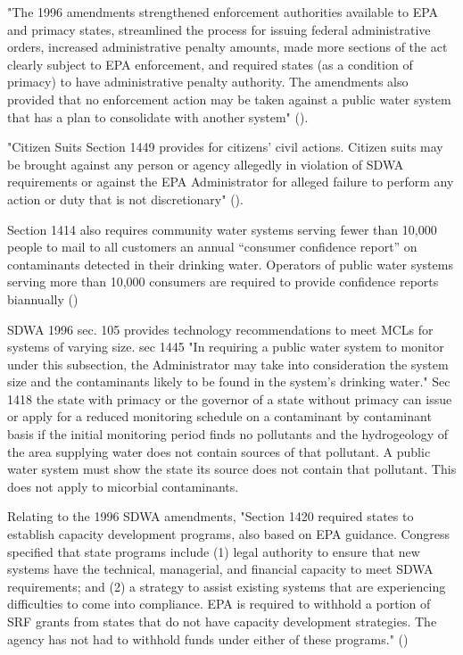 "The 1996 amendments strengthened enforcement authorities available to EPA and primacy states, streamlined the process for issuing federal administrative orders, increased administrative penalty amounts, made more sections of the act clearly subject to EPA enforcement, and required states (as a condition of primacy) to have administrative penalty authority. The amendments also provided that no enforcement action may be taken against a public water system that has a plan to consolidate with another system" (\cite{tiemann2014safe}).

"Citizen Suits Section 1449 provides for citizens’ civil actions. Citizen suits may be brought against any person or agency allegedly in violation of SDWA requirements or against the EPA Administrator for alleged failure to perform any action or duty that is not discretionary" (\cite{tiemann2014safe}).

Section 1414 also requires community water systems serving fewer than 10,000 people to mail to 
all customers an annual “consumer confidence report” on contaminants detected in their drinking 
water. Operators of public water systems serving more than 10,000 consumers are required to 
provide confidence reports biannually (\cite{tiemann2014safe})

SDWA 1996 sec. 105 provides technology recommendations to meet MCLs for systems of varying size. sec 1445 "In requiring a public water system to monitor under this subsection, the Administrator may take into consideration the system size and the contaminants likely to be found in the system's drinking water." Sec 1418 the state with primacy or the governor of a state without primacy can issue or apply for a reduced monitoring schedule on a contaminant by contaminant basis if the initial monitoring period finds no pollutants and the hydrogeology of the area supplying water does not contain sources of that pollutant. A public water system must show the state its source does not contain that pollutant. This does not apply to micorbial contaminants.

Relating to the 1996 SDWA amendments, "Section 1420 required states to establish capacity 
development programs, also based on EPA guidance. Congress specified that state programs 
include (1) legal authority to ensure that new systems have the technical, managerial, and 
financial capacity to meet SDWA requirements; and (2) a strategy to assist existing systems that 
are experiencing difficulties to come into compliance. EPA is required to withhold a portion of 
SRF grants from states that do not have capacity development strategies. The agency has not had 
to withhold funds under either of these programs." (\cite{tiemann2014safe})

